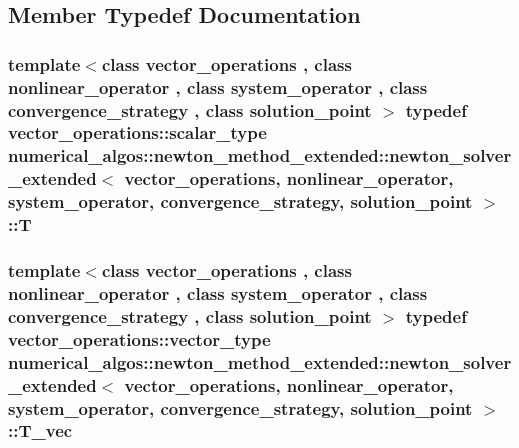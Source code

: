 \subsection{Member Typedef Documentation}
\hypertarget{classnumerical__algos_1_1newton__method__extended_1_1newton__solver__extended_a32ed9a6f34b0fcff996c913f4695e1c0}{
\subsubsection[{T}]{\setlength{\rightskip}{0pt plus 5cm}template$<$class vector\-\_\-operations , class nonlinear\-\_\-operator , class system\-\_\-operator , class convergence\-\_\-strategy , class solution\-\_\-point $>$ typedef {\bf vector\-\_\-operations\-::scalar\-\_\-type} {\bf numerical\-\_\-algos\-::newton\-\_\-method\-\_\-extended\-::newton\-\_\-solver\-\_\-extended}$<$ {\bf vector\-\_\-operations}, nonlinear\-\_\-operator, {\bf system\-\_\-operator}, convergence\-\_\-strategy, solution\-\_\-point $>$\-::{\bf T}}}\label{classnumerical__algos_1_1newton__method__extended_1_1newton__solver__extended_a32ed9a6f34b0fcff996c913f4695e1c0}
\hypertarget{classnumerical__algos_1_1newton__method__extended_1_1newton__solver__extended_a9271222e5554cc0824604ab062a2cace}{
\subsubsection[{T\-\_\-vec}]{\setlength{\rightskip}{0pt plus 5cm}template$<$class vector\-\_\-operations , class nonlinear\-\_\-operator , class system\-\_\-operator , class convergence\-\_\-strategy , class solution\-\_\-point $>$ typedef {\bf vector\-\_\-operations\-::vector\-\_\-type} {\bf numerical\-\_\-algos\-::newton\-\_\-method\-\_\-extended\-::newton\-\_\-solver\-\_\-extended}$<$ {\bf vector\-\_\-operations}, nonlinear\-\_\-operator, {\bf system\-\_\-operator}, convergence\-\_\-strategy, solution\-\_\-point $>$\-::{\bf T\-\_\-vec}}}\label{classnumerical__algos_1_1newton__method__extended_1_1newton__solver__extended_a9271222e5554cc0824604ab062a2cace}


